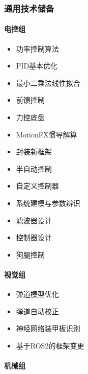 \subsubsection{通用技术储备}
    
    \paragraph{电控组}


        \begin{itemize}
            \item 功率控制算法
            \item PID基本优化
            \item 最小二乘法线性拟合
            \item 前馈控制
            \item 力控底盘
            \item MotionFX惯导解算
            \item 封装新框架
            \item 半自动控制
            \item 自定义控制器
            \item 系统建模与参数辨识
            \item 滤波器设计
            \item 控制器设计
            \item 狗腿控制
        \end{itemize}
    
    \paragraph{视觉组}


        \begin{itemize}
            \item 弹道模型优化
            \item 弹道自动校正
            \item 神经网络装甲板识别
            \item 基于ROS2的框架变更
        \end{itemize}

    \paragraph{机械组}

